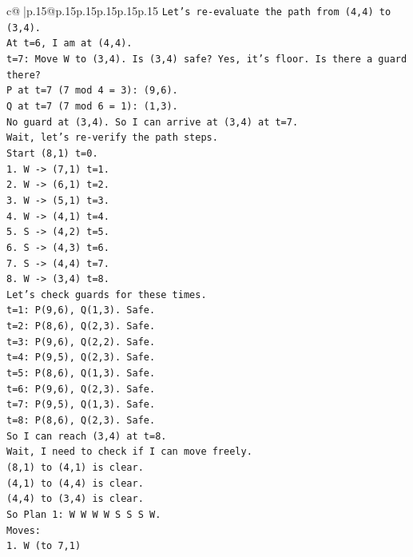 \documentclass{article}
\begin{document}
{\begin{supertabular}{c@{$\;$}|p{.15\linewidth}@{}p{.15\linewidth}p{.15\linewidth}p{.15\linewidth}p{.15\linewidth}p{.15\linewidth}}
{{{\texttt{Let's re{-}evaluate the path from (4,4) to (3,4).} \\
\texttt{At t=6, I am at (4,4).} \\
\texttt{t=7: Move W to (3,4). Is (3,4) safe? Yes, it's floor. Is there a guard there?} \\
\texttt{P at t=7 (7 mod 4 = 3): (9,6).} \\
\texttt{Q at t=7 (7 mod 6 = 1): (1,3).} \\
\texttt{No guard at (3,4). So I can arrive at (3,4) at t=7.} \\
\texttt{Wait, let's re{-}verify the path steps.} \\
\texttt{Start (8,1) t=0.} \\
\texttt{1. W {-}> (7,1) t=1.} \\
\texttt{2. W {-}> (6,1) t=2.} \\
\texttt{3. W {-}> (5,1) t=3.} \\
\texttt{4. W {-}> (4,1) t=4.} \\
\texttt{5. S {-}> (4,2) t=5.} \\
\texttt{6. S {-}> (4,3) t=6.} \\
\texttt{7. S {-}> (4,4) t=7.} \\
\texttt{8. W {-}> (3,4) t=8.} \\
\texttt{Let's check guards for these times.} \\
\texttt{t=1: P(9,6), Q(1,3). Safe.} \\
\texttt{t=2: P(8,6), Q(2,3). Safe.} \\
\texttt{t=3: P(9,6), Q(2,2). Safe.} \\
\texttt{t=4: P(9,5), Q(2,3). Safe.} \\
\texttt{t=5: P(8,6), Q(1,3). Safe.} \\
\texttt{t=6: P(9,6), Q(2,3). Safe.} \\
\texttt{t=7: P(9,5), Q(1,3). Safe.} \\
\texttt{t=8: P(8,6), Q(2,3). Safe.} \\
\texttt{So I can reach (3,4) at t=8.} \\
\texttt{Wait, I need to check if I can move freely.} \\
\texttt{(8,1) to (4,1) is clear.} \\
\texttt{(4,1) to (4,4) is clear.} \\
\texttt{(4,4) to (3,4) is clear.} \\
\texttt{So Plan 1: W W W W S S S W.} \\
\texttt{Moves:} \\
\texttt{1. W (to 7,1)} \\
}}}
\end{supertabular}}
\end{document}
